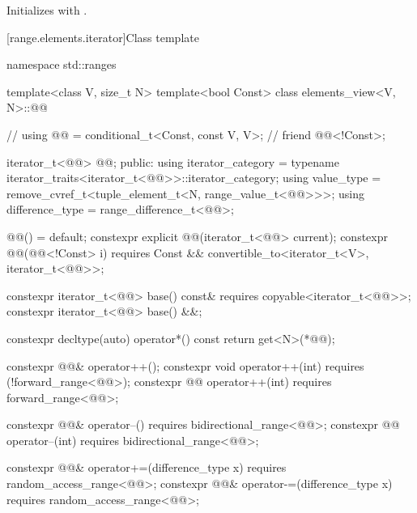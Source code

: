 \begin{itemdescr}
\pnum
\effects
Initializes  with .
\end{itemdescr}

[range.elements.iterator]{Class template }

%
\begin{codeblock}
namespace std::ranges {
  template<class V, size_t N>
  template<bool Const>
  class elements_view<V, N>::@@ {                 // \expos
    using @@ = conditional_t<Const, const V, V>;    // \expos
    friend @@<!Const>;

    iterator_t<@@> @@;
  public:
    using iterator_category = typename iterator_traits<iterator_t<@@>>::iterator_category;
    using value_type = remove_cvref_t<tuple_element_t<N, range_value_t<@@>>>;
    using difference_type = range_difference_t<@@>;

    @@() = default;
    constexpr explicit @@(iterator_t<@@> current);
    constexpr @@(@@<!Const> i)
      requires Const && convertible_to<iterator_t<V>, iterator_t<@@>>;

    constexpr iterator_t<@@> base() const&
      requires copyable<iterator_t<@@>>;
    constexpr iterator_t<@@> base() &&;

    constexpr decltype(auto) operator*() const
    { return get<N>(*@@); }

    constexpr @@& operator++();
    constexpr void operator++(int) requires (!forward_range<@@>);
    constexpr @@ operator++(int) requires forward_range<@@>;

    constexpr @@& operator--() requires bidirectional_range<@@>;
    constexpr @@ operator--(int) requires bidirectional_range<@@>;

    constexpr @@& operator+=(difference_type x)
      requires random_access_range<@@>;
    constexpr @@& operator-=(difference_type x)
      requires random_access_range<@@>;

}}
\end{codeblock}

